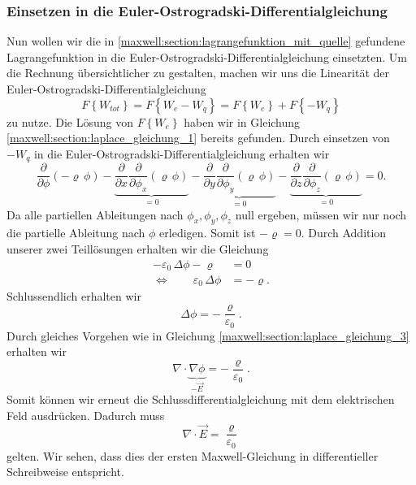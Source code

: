 \subsubsection{Einsetzen in die Euler-Ostrogradski-Differentialgleichung}
Nun wollen wir die in \eqref{maxwell:section:lagrangefunktion_mit_quelle} gefundene Lagrangefunktion in die Euler-Ostrogradski-Differentialgleichung einsetzten.
Um die Rechnung übersichtlicher zu gestalten, machen wir uns die Linearität der Euler-Ostrogradski-Differentialgleichung
\begin{equation}
F\left\{W_{tot}\right\}
=
F\left\{W_e - W_q\right\}
=
F\left\{W_e\right\} + F\left\{-W_q\right\}
\label{maxwell:section:linearität_von_DGL}
\end{equation}
zu nutze.
Die Lösung von $F\left\{W_e\right\}$ haben wir in Gleichung \eqref{maxwell:section:laplace_gleichung_1} bereits gefunden.
Durch einsetzen von $-W_q$ in die Euler-Ostrogradski-Differentialgleichung erhalten wir
\[
\frac{\partial}{\partial\phi}\left(-\varrho\,\phi\right) - \underbrace{\frac{\partial}{\partial x}\frac{\partial}{\partial\phi_x}\left(\varrho\,\phi\right)}_{=0} - \underbrace{\frac{\partial}{\partial y}\frac{\partial}{\partial\phi_y}\left(\varrho\,\phi\right)}_{=0} - \underbrace{\frac{\partial}{\partial z}\frac{\partial}{\partial\phi_z}\left(\varrho\,\phi\right)}_{=0}
=
0.
\]
Da alle partiellen Ableitungen nach $\phi_x, \phi_y, \phi_z$ null ergeben, müssen wir nur noch die partielle Ableitung nach $\phi$ erledigen.
Somit ist
\(
-\varrho
=
0.
\)
Durch Addition unserer zwei Teillösungen erhalten wir die Gleichung
\begin{align*}
-\varepsilon_0\,\Delta\phi - \varrho
&=
0
\\
\Leftrightarrow \qquad \varepsilon_0\,\Delta\phi
&=
-\varrho.
\end{align*}
Schlussendlich erhalten wir
\begin{equation}
\Delta\phi
=
-\frac{\varrho}{\varepsilon_0}.
\label{maxwell:section:erste_maxwellgleichung_1}
\end{equation}
Durch gleiches Vorgehen wie in Gleichung \eqref{maxwell:section:laplace_gleichung_3} erhalten wir
\[
\nabla\cdot\underbrace{\nabla\phi}_{\displaystyle-\vec{E}}
=
-\frac{\varrho}{\varepsilon_0}.
\]
Somit können wir erneut die Schlussdifferentialgleichung mit dem elektrischen Feld ausdrücken. Dadurch muss
\begin{equation}
\nabla\cdot\vec{E}
=
\frac{\varrho}{\varepsilon_0}
\label{maxwell:section:erste_maxwellgleichung_2}
\end{equation}
gelten.
Wir sehen, dass dies der ersten Maxwell-Gleichung in differentieller Schreibweise entspricht.

